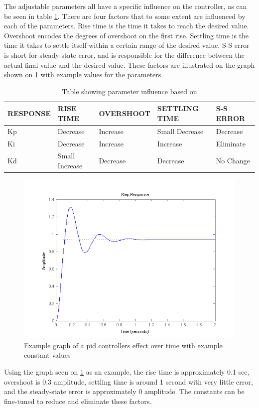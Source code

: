 The adjustable parameters all have a specific influence on the controller, as can be seen in table \ref{pid_char}. There are four factors that to some extent are influenced by each of the parameters. Rise time is the time it takes to reach the desired value. Overshoot encodes the degrees of overshoot on the first rise. Settling time is the time it takes to settle itself within a certain range of the desired value. S-S error is short for steady-state error, and is responsible for the difference between the actual final value and the desired value.
These factors are illustrated on the graph shown on \ref{fig:pid_graph} with example values for the parameters.
\begin{table}[H]
\begin{tabular}{|l|l|l|l|l|}
\hline
RESPONSE & RISE TIME    & OVERSHOOT & SETTLING TIME & S-S ERROR \\ \hline
Kp          & Decrease     & Increase  & Small Decrease  & Decrease  \\ \hline
Ki          & Decrease     & Increase  & Increase      & Eliminate \\ \hline
Kd          & Small Increase & Decrease  & Decrease      & No Change \\ \hline
\end{tabular}
\caption{Table showing parameter influence based on \citep[University of Michigan]{pid_controller}}
\label{pid_char}
\end{table}

\begin{figure}[H]
\includegraphics[scale=1]{graphics/pid_graph.png}
\caption{Example graph of a \gls{pid} controllers effect over time with example constant values\cite{pid_controlle_picr}}
\label{fig:pid_graph}
\end{figure}
Using the graph seen on \ref{fig:pid_graph} as an example, the rise time is approximately 0.1 sec, overshoot is 0.3 amplitude, settling time is around 1 second with very little error, and the steady-state error is approximately 0 amplitude. The constants can be fine-tuned to reduce and eliminate these factors.

